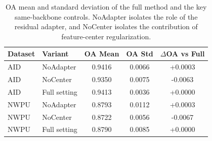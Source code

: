 \begin{table}[t]
  \centering
  \scriptsize
  \setlength{\tabcolsep}{3pt}
  \caption{OA mean and standard deviation of the full method and the key same-backbone controls. NoAdapter isolates the role of the residual adapter, and NoCenter isolates the contribution of feature-center regularization.}
  \label{tab:stability_results}
  \begin{tabular}{l >{\raggedright\arraybackslash}p{} c c c}
    \toprule
    Dataset & Variant & OA Mean & OA Std & $\Delta$OA vs Full \\
    \midrule
    AID & NoAdapter & 0.9416 & 0.0066 & +0.0003 \\
    AID & NoCenter & 0.9350 & 0.0075 & -0.0063 \\
    AID & Full setting & 0.9413 & 0.0036 & +0.0000 \\
    NWPU & NoAdapter & 0.8793 & 0.0112 & +0.0003 \\
    NWPU & NoCenter & 0.8722 & 0.0056 & -0.0067 \\
    NWPU & Full setting & 0.8790 & 0.0085 & +0.0000 \\
    \bottomrule
  \end{tabular}
\end{table}
